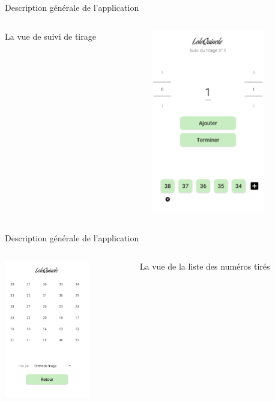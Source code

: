 \documentclass{beamer}
\begin{document}
\begin{frame}{Description générale de l'application}
    \begin{columns}[T]
     \begin{column}[c]{5cm}
     La vue de suivi de tirage
     \end{column}
     \begin{column}[c]{5cm}
          \includegraphics[height=8cm]{Images/suivi.png}
     \end{column}
     \end{columns}
\end{frame}

\begin{frame}{Description générale de l'application}
    \begin{columns}[T]
    \begin{column}[c]{5cm}
        \includegraphics[height=6cm]{Images/liste.png}
    \end{column}
    \begin{column}[c]{5cm}
    La vue de la liste des numéros tirés
    \end{column}
    \end{columns}
\end{frame}
\end{document}
